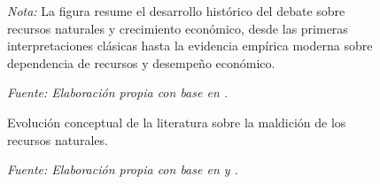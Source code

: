 \documentclass[../../PTFM.tex]{subfiles}
\begin{document}
\begin{figure}[H]
{\begin{tikzpicture}
			\end{tikzpicture}
		}

		\caption[Evolución de la literatura sobre la maldición de los recursos]{Evolución conceptual de la literatura sobre la maldición de los recursos naturales.}

		\label{fig:resource_curse_timeline}

		\footnotesize
		\textit{Nota:} La figura resume el desarrollo histórico del debate sobre recursos naturales y crecimiento económico, desde las primeras interpretaciones clásicas hasta la evidencia empírica moderna sobre dependencia de recursos y desempeño económico.

		\textit{Fuente: Elaboración propia con base en \textcite{Anne2021}.}

	\end{figure}


	\vspace{1cm}


	\begin{figure}[H]
		\centering

		\caption[Capacidades productivas y complejidad económica]{Relación conceptual entre capacidades productivas, diversificación y complejidad económica.}

		\label{fig:secuencia-complejidad}
		\caption*{\footnotesize \textit{Fuente: Elaboración propia con base en \textcite{Hidalgo2009} y \textcite{Hausmann2014}.}}
	\end{figure}
\end{document}
